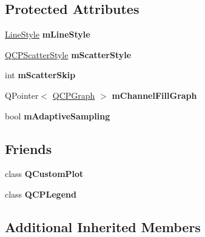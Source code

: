 \subsection*{Protected Attributes}
\begin{DoxyCompactItemize}
\item 
\hyperlink{class_q_c_p_graph_ad60175cd9b5cac937c5ee685c32c0859}{Line\+Style} {\bfseries m\+Line\+Style}\hypertarget{class_q_c_p_graph_a8604fd98402035a63375849f7341ee25}{}\label{class_q_c_p_graph_a8604fd98402035a63375849f7341ee25}

\item 
\hyperlink{class_q_c_p_scatter_style}{Q\+C\+P\+Scatter\+Style} {\bfseries m\+Scatter\+Style}\hypertarget{class_q_c_p_graph_a4aa36241f166ccd1f75fc8f24e4a3247}{}\label{class_q_c_p_graph_a4aa36241f166ccd1f75fc8f24e4a3247}

\item 
int {\bfseries m\+Scatter\+Skip}\hypertarget{class_q_c_p_graph_a4ca1e50fbfe8307022b42a6f6178fae0}{}\label{class_q_c_p_graph_a4ca1e50fbfe8307022b42a6f6178fae0}

\item 
Q\+Pointer$<$ \hyperlink{class_q_c_p_graph}{Q\+C\+P\+Graph} $>$ {\bfseries m\+Channel\+Fill\+Graph}\hypertarget{class_q_c_p_graph_a2636d7976a9bab61e0eb3a4d28a2bb6f}{}\label{class_q_c_p_graph_a2636d7976a9bab61e0eb3a4d28a2bb6f}

\item 
bool {\bfseries m\+Adaptive\+Sampling}\hypertarget{class_q_c_p_graph_aa951e78aeba714cf443be6da2e52502e}{}\label{class_q_c_p_graph_aa951e78aeba714cf443be6da2e52502e}

\end{DoxyCompactItemize}
\subsection*{Friends}
\begin{DoxyCompactItemize}
\item 
class {\bfseries Q\+Custom\+Plot}\hypertarget{class_q_c_p_graph_a00f8b42d059625f815808a7cc99c2f04}{}\label{class_q_c_p_graph_a00f8b42d059625f815808a7cc99c2f04}

\item 
class {\bfseries Q\+C\+P\+Legend}\hypertarget{class_q_c_p_graph_a6dddb88f268bc26693c552bbb68acbb5}{}\label{class_q_c_p_graph_a6dddb88f268bc26693c552bbb68acbb5}

\end{DoxyCompactItemize}
\subsection*{Additional Inherited Members}


